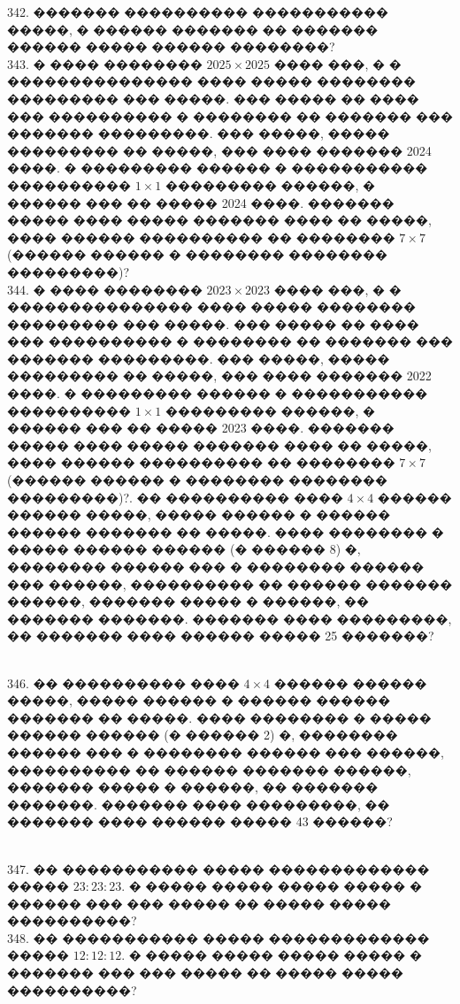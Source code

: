 \documentclass[12pt]{article}
\begin{document}
342. ������� ���������� ����������� �����, � ������ ������� �� ������� ������ ����� ������ ��������?\\
343. � ���� �������� $2025\times2025$ ���� ���, � � ��������������� ���� ����� �������� ��������� ��� �����. ��� ����� �� ���� ��� ���������� � �������� �� ������� ��� ������� ���������. ��� �����, ����� ��������� �� �����, ��� ���� ������� 2024 ����. � ��������� ������ � ����������� ���������� $1\times1$ ��������� ������, � ������ ��� �� ����� 2024 ����. ������� ����� ���� ����� ������� ���� �� �����, ���� ������ ���������� �� �������� $7\times7$ (������ ������ � �������� �������� ���������)?\\
344. � ���� �������� $2023\times2023$ ���� ���, � � ��������������� ���� ����� �������� ��������� ��� �����. ��� ����� �� ���� ��� ���������� � �������� �� ������� ��� ������� ���������. ��� �����, ����� ��������� �� �����, ��� ���� ������� 2022 ����. � ��������� ������ � ����������� ���������� $1\times1$ ��������� ������, � ������ ��� �� ����� 2023 ����. ������� ����� ���� ����� ������� ���� �� �����, ���� ������ ���������� �� �������� $7\times7$ (������ ������ � �������� �������� ���������)?\newpage{}. �� ���������� ���� $4\times4$ ������ ������ �����, ����� ������ � ������ ������ ������� �� �����. ���� �������� � ����� ������ ������ (� ������ 8) �, �������� ������ ��� � �������� ������ ��� ������, ���������� �� ������ ������� ������, ������� ����� � ������, �� ������� �������. ������� ���� ���������, �� ������� ���� ������ ����� 25 �������?\\
\begin{figure}[ht!]
\end{figure}\\
346. �� ���������� ���� $4\times4$ ������ ������ �����, ����� ������ � ������ ������ ������� �� �����. ���� �������� � ����� ������ ������ (� ������ 2) �, �������� ������ ��� � �������� ������ ��� ������, ���������� �� ������ ������� ������, ������� ����� � ������, �� ������� �������. ������� ���� ���������, �� ������� ���� ������ ����� 43 ������?\\
\begin{figure}[ht!]
\end{figure}\\
347. �� ����������� ����� ������������� ����� $23:23:23.$ � ����� ����� ����� ����� � ������ ��� ��� ����� �� ����� ����� ����������?\\
348. �� ����������� ����� ������������� ����� $12:12:12.$ � ����� ����� ����� ����� � ������� ��� ��� ����� �� ����� ����� ����������?\\
\end{document}
